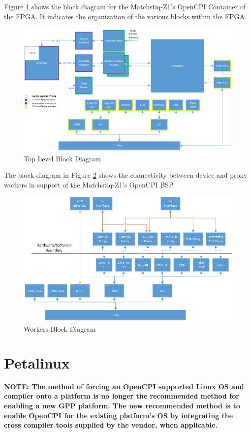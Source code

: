\noindent Figure \ref{fig:toplevel} shows the block diagram for the Matchstiq-Z1's OpenCPI Container of the FPGA. It indicates the organization of the various blocks within the FPGA.
    \begin{figure}[H]
      \centerline{\includegraphics[scale=0.65]{matchstiq_BSP_toplevel}}
      \caption{Top Level Block Diagram}
      \label{fig:toplevel}
    \end{figure}

\pagebreak
\noindent The block diagram in Figure \ref{fig:workerlevel} shows the connectivity between device and proxy workers in support of the Matchstiq-Z1's OpenCPI BSP.
    \begin{figure}[H]
      \centerline{\includegraphics[scale=0.65]{matchstiq_BSP_worker}}
      \caption{Workers Block Diagram}
      \label{fig:workerlevel}
    \end{figure}

\section{Petalinux}
  \textbf{NOTE: The method of forcing an OpenCPI supported Linux OS and compiler onto a platform is no longer the recommended method for enabling a new GPP platform. The new recommended method is to enable OpenCPI for the existing platform's OS by integrating the cross compiler tools supplied by the vendor, when applicable.} \\

